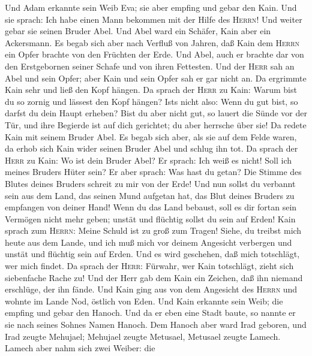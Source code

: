  Und Adam erkannte sein Weib Eva; sie aber empfing und
gebar den Kain. Und sie sprach: Ich habe einen Mann bekommen mit der
Hilfe des \textsc{Herrn}!  Und weiter gebar sie seinen
Bruder Abel. Und Abel ward ein Schäfer, Kain aber ein Ackersmann.
 Es begab sich aber nach Verfluß von Jahren, daß Kain dem
\textsc{Herrn} ein Opfer brachte von den Früchten der Erde.
 Und Abel, auch er brachte dar von den Erstgebornen seiner
Schafe und von ihren Fettesten.  Und der \textsc{Herr} sah
an Abel und sein Opfer; aber Kain und sein Opfer sah er gar nicht an. Da
ergrimmte Kain sehr und ließ den Kopf hängen.  Da sprach
der \textsc{Herr} zu Kain: Warum bist du so zornig und lässest den Kopf
hängen? Ist\textquotesingle s nicht also: Wenn du gut bist, so darfst du
dein Haupt erheben?  Bist du aber nicht gut, so lauert die
Sünde vor der Tür, und ihre Begierde ist auf dich gerichtet; du aber
herrsche über sie!  Da redete Kain mit seinem Bruder Abel.
Es begab sich aber, als sie auf dem Felde waren, da erhob sich Kain
wider seinen Bruder Abel und schlug ihn tot.  Da sprach
der \textsc{Herr} zu Kain: Wo ist dein Bruder Abel? Er sprach: Ich weiß
es nicht! Soll ich meines Bruders Hüter sein?  Er aber
sprach: Was hast du getan? Die Stimme des Blutes deines Bruders schreit
zu mir von der Erde!  Und nun sollst du verbannt sein aus
dem Land, das seinen Mund aufgetan hat, das Blut deines Bruders zu
empfangen von deiner Hand!  Wenn du das Land bebaust,
soll es dir fortan sein Vermögen nicht mehr geben; unstät und flüchtig
sollst du sein auf Erden!  Kain sprach zum
\textsc{Herrn}: Meine Schuld ist zu groß zum Tragen! 
Siehe, du treibst mich heute aus dem Lande, und ich muß mich vor deinem
Angesicht verbergen und unstät und flüchtig sein auf Erden. Und es wird
geschehen, daß mich totschlägt, wer mich findet.  Da
sprach der \textsc{Herr}: Fürwahr, wer Kain totschlägt, zieht sich
siebenfache Rache zu! Und der Herr gab dem Kain ein Zeichen, daß ihn
niemand erschlüge, der ihn fände.  Und Kain ging aus von
dem Angesicht des \textsc{Herrn} und wohnte im Lande Nod, östlich von
Eden.  Und Kain erkannte sein Weib; die empfing und gebar
den Hanoch. Und da er eben eine Stadt baute, so nannte er sie nach
seines Sohnes Namen Hanoch.  Dem Hanoch aber ward Irad
geboren, und Irad zeugte Mehujael; Mehujael zeugte Metusael, Metusael
zeugte Lamech.  Lamech aber nahm sich zwei Weiber: die

